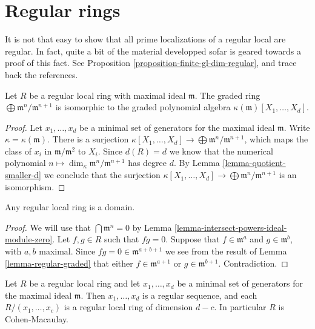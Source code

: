 \section{Regular rings}
\label{section-regular}

\noindent
It is not that easy to show that all prime localizations of a regular local
are regular. In fact, quite a bit of the material developped sofar is
geared towards a proof of this fact. See
Proposition \ref{proposition-finite-gl-dim-regular}, and
trace back the references.

\begin{lemma}
\label{lemma-regular-graded}
Let $R$ be a regular local ring with maximal ideal $\mathfrak m$.
The graded ring $\bigoplus \mathfrak m^n / \mathfrak m^{n + 1}$
is isomorphic to the graded polynomial algebra
$\kappa(\mathfrak m)[X_1, \ldots, X_d]$.
\end{lemma}

\begin{proof}
Let $x_1, \ldots, x_d$ be a minimal set of generators
for the maximal ideal $\mathfrak m$.
Write $\kappa = \kappa(\mathfrak m)$.
There is a surjection $\kappa[X_1, \ldots, X_d]
\to \bigoplus \mathfrak m^n/\mathfrak m^{n + 1}$,
which maps the class of $x_i$ in $\mathfrak m/\mathfrak m^2$
to $X_i$. Since $d(R) = d$ we know that the numerical
polynomial $n \mapsto \dim_\kappa \mathfrak m^n/\mathfrak m^{n + 1}$
has degree $d$. By Lemma \ref{lemma-quotient-smaller-d} we
conclude that the surjection $\kappa[X_1, \ldots, X_d]
\to \bigoplus \mathfrak m^n/\mathfrak m^{n + 1}$ is an isomorphism.
\end{proof}

\begin{lemma}
\label{lemma-regular-domain}
Any regular local ring is a domain.
\end{lemma}

\begin{proof}
We will use that $\bigcap \mathfrak m^n = 0$
by Lemma \ref{lemma-intersect-powers-ideal-module-zero}.
Let $f, g \in R$ such that $fg = 0$.
Suppose that $f \in \mathfrak m^a$ and
$g \in \mathfrak m^b$, with $a, b$ maximal.
Since $fg = 0 \in \mathfrak m^{a + b + 1}$
we see from the result of Lemma \ref{lemma-regular-graded}
that either $f \in \mathfrak m^{a + 1}$ or
$g \in \mathfrak m^{b + 1}$. Contradiction.
\end{proof}

\begin{lemma}
\label{lemma-regular-ring-CM}
Let $R$ be a regular local ring and let
$x_1, \ldots, x_d$ be a minimal set of generators
for the maximal ideal $\mathfrak m$. Then
$x_1, \ldots, x_d$ is a regular sequence, and
each $R/(x_1, \ldots, x_c)$ is a regular local ring
of dimension $d - c$. In particular $R$ is Cohen-Macaulay.
\end{lemma}

